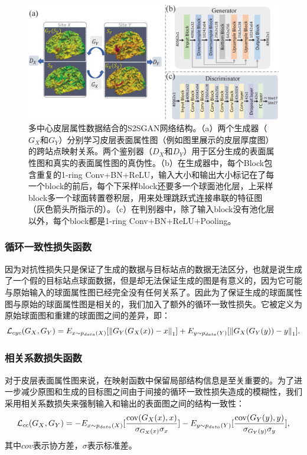 \begin{figure}[t]
	\centering
	\includegraphics[width=\linewidth]{figure/s2sgan_architecture.eps}
	\caption{多中心皮层属性数据结合的S2SGAN网络结构。（a）两个生成器（$G_X$和$G_Y$）分别学习皮层表面属性图（例如图里展示的皮层厚度图）的跨站点映射关系。两个鉴别器（$D_X$和$D_Y$）用于区分生成的表面属性图和真实的表面属性图的真伪性。（b）在生成器中，每个Block包含重复的1-ring Conv+BN+ReLU，输入大小和输出大小标记在了每一个block的前后，每个下采样block还要多一个球面池化层，上采样block多一个球面转置卷积层，用来处理跳跃式连接串联的特征图（灰色箭头所指示的）。（c）在判别器中，除了输入block没有池化层以外，每个block都是1-ring Conv+BN+ReLU+Pooling。}\label{fig:s2sgan_architecture} 
\end{figure} 
	
\subsubsection{循环一致性损失函数}
因为对抗性损失只是保证了生成的数据与目标站点的数据无法区分，也就是说生成了一个假的目标站点球面数据，但是却无法保证生成的图是有意义的，因为它可能与原始输入的球面属性图已经完全没有任何关系了。因此为了保证生成的球面属性图与原始的球面属性图是相关的，我们加入了额外的循环一致性损失\cite{zhu2017unpaired}。它被定义为原始球面图和重建的球面图之间的差异，即：
\begin{equation}
	   	{{\cal L}_{cyc}}({G_X},{G_Y}) = {E_{x\sim{p_{data}}(X)}}[{\left\| {{G_Y}({G_X}(x)) - x} \right\|_1}] + {E_{y\sim{p_{data}}(Y)}}[{\left\| {{G_X}({G_Y}(y)) - y} \right\|_1}]. 
\end{equation}

\subsubsection{相关系数损失函数}
对于皮层表面属性图来说，在映射函数中保留局部结构信息是至关重要的。为了进一步减少原图和生成的目标图之间由于间接的循环一致性损失造成的模糊性，我们采用相关系数损失来强制输入和输出的表面图之间的结构一致性：
\begin{equation}
	{{\cal L}_{cc}}({G_X},{G_Y}) =  - {E_{x\sim{p_{data}}(X)}}[\frac{{{\mathop{\rm cov}} ({G_X}(x),x)}}{{{\sigma _{{G_X}(x)}}{\sigma _x}}}] - {E_{y\sim{p_{data}}(Y)}}[\frac{{{\mathop{\rm cov}} ({G_Y}(y),y)}}{{{\sigma _{{G_Y}(y)}}{\sigma _y}}}],
\end{equation}
其中$cov$表示协方差，$\sigma$表示标准差。
	
